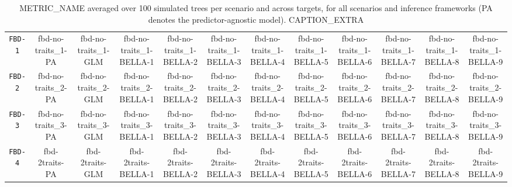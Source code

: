 \begin{landscape}
\begin{table}[h!]
\begin{tabular}{cccccccccccc}
            \texttt{FBD-1}    & {{fbd-no-traits_1-PA}} & {{fbd-no-traits_1-GLM}} & {{fbd-no-traits_1-BELLA-1}} & {{fbd-no-traits_1-BELLA-2}} & {{fbd-no-traits_1-BELLA-3}} & {{fbd-no-traits_1-BELLA-4}} & {{fbd-no-traits_1-BELLA-5}} & {{fbd-no-traits_1-BELLA-6}} & {{fbd-no-traits_1-BELLA-7}} & {{fbd-no-traits_1-BELLA-8}} & {{fbd-no-traits_1-BELLA-9}} \\[6pt]

            \texttt{FBD-2}    & {{fbd-no-traits_2-PA}} & {{fbd-no-traits_2-GLM}} & {{fbd-no-traits_2-BELLA-1}} & {{fbd-no-traits_2-BELLA-2}} & {{fbd-no-traits_2-BELLA-3}} & {{fbd-no-traits_2-BELLA-4}} & {{fbd-no-traits_2-BELLA-5}} & {{fbd-no-traits_2-BELLA-6}} & {{fbd-no-traits_2-BELLA-7}} & {{fbd-no-traits_2-BELLA-8}} & {{fbd-no-traits_2-BELLA-9}} \\[6pt]

            \texttt{FBD-3}    & {{fbd-no-traits_3-PA}} & {{fbd-no-traits_3-GLM}} & {{fbd-no-traits_3-BELLA-1}} & {{fbd-no-traits_3-BELLA-2}} & {{fbd-no-traits_3-BELLA-3}} & {{fbd-no-traits_3-BELLA-4}} & {{fbd-no-traits_3-BELLA-5}} & {{fbd-no-traits_3-BELLA-6}} & {{fbd-no-traits_3-BELLA-7}} & {{fbd-no-traits_3-BELLA-8}} & {{fbd-no-traits_3-BELLA-9}} \\[6pt]

            \texttt{FBD-4}    & {{fbd-2traits-PA}}     & {{fbd-2traits-GLM}}     & {{fbd-2traits-BELLA-1}}     & {{fbd-2traits-BELLA-2}}     & {{fbd-2traits-BELLA-3}}     & {{fbd-2traits-BELLA-4}}     & {{fbd-2traits-BELLA-5}}     & {{fbd-2traits-BELLA-6}}     & {{fbd-2traits-BELLA-7}}     & {{fbd-2traits-BELLA-8}}     & {{fbd-2traits-BELLA-9}}     \\[6pt]

            \bottomrule
        \end{tabular}
        \caption{{{METRIC_NAME}} averaged over 100 simulated trees per scenario and across targets, for all scenarios and inference frameworks (PA denotes the predictor-agnostic model). {{CAPTION_EXTRA}}}%
        \label{tab:{{METRIC_LABEL}}}
    \end{table}
\end{landscape}
